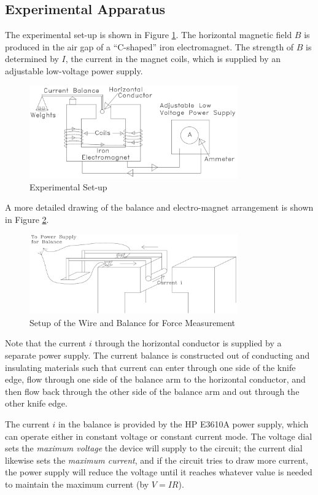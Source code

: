 \subsection{Experimental Apparatus}
The experimental set-up is shown in Figure {\ref{fig:set-up}}. The horizontal magnetic field $B$ is produced in the air gap of a ``C-shaped'' iron electromagnet. The strength of $B$ is determined by $I$, the current in the magnet coils, which is supplied by an adjustable low-voltage power supply.\myskip
\begin{figure}[h]
\centering
\includegraphics[width=0.8\textwidth]{./Exp4/pic/image2.png}
\caption{Experimental Set-up}
\label{fig:set-up}
\end{figure} 

A more detailed drawing of the balance and electro-magnet arrangement is shown in Figure {\ref{fig:measureforce}}.
\begin{figure}[h]
\centering
\includegraphics[width=0.8\textwidth]{./Exp4/pic/image3.png}
\caption{Setup of the Wire and Balance for Force Measurement}
\label{fig:measureforce}
\end{figure} 

Note that the current $i$ through the horizontal conductor is supplied by a separate power supply. The current balance is constructed out of conducting and insulating materials such that current can enter through one side of the knife edge, flow through one side of the balance arm to the horizontal conductor, and then flow back through the other side of the balance arm and out through the other knife edge. \myskip

The current $i$ in the balance is provided by the HP E3610A power supply, which can operate either in constant voltage or constant current mode. The voltage dial sets the \emph{maximum voltage} the device will supply to the circuit; the current dial likewise sets the \emph{maximum current}, and if the circuit tries to draw more current, the power supply will reduce the voltage until it reaches whatever value is needed to maintain the maximum current (by $V = IR$). \myskip 


